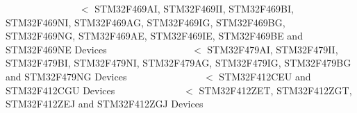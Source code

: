 ~\newline
~\newline
~\newline
~\newline
~\newline
~\newline
~\newline
~\newline
~\newline
 $<$ S\+T\+M32\+F469\+AI, S\+T\+M32\+F469\+II, S\+T\+M32\+F469\+BI, S\+T\+M32\+F469\+NI, S\+T\+M32\+F469\+AG, S\+T\+M32\+F469\+IG, S\+T\+M32\+F469\+BG, S\+T\+M32\+F469\+NG, S\+T\+M32\+F469\+AE, S\+T\+M32\+F469\+IE, S\+T\+M32\+F469\+BE and S\+T\+M32\+F469\+NE Devices ~\newline
~\newline
~\newline
~\newline
~\newline
~\newline
~\newline
~\newline
~\newline
~\newline
 $<$ S\+T\+M32\+F479\+AI, S\+T\+M32\+F479\+II, S\+T\+M32\+F479\+BI, S\+T\+M32\+F479\+NI, S\+T\+M32\+F479\+AG, S\+T\+M32\+F479\+IG, S\+T\+M32\+F479\+BG and S\+T\+M32\+F479\+NG Devices ~\newline
~\newline
~\newline
~\newline
~\newline
~\newline
~\newline
~\newline
~\newline
 $<$ S\+T\+M32\+F412\+C\+EU and S\+T\+M32\+F412\+C\+GU Devices ~\newline
~\newline
~\newline
~\newline
~\newline
~\newline
~\newline
~\newline
 $<$ S\+T\+M32\+F412\+Z\+ET, S\+T\+M32\+F412\+Z\+GT, S\+T\+M32\+F412\+Z\+EJ and S\+T\+M32\+F412\+Z\+GJ Devices ~\newline
~\newline
~\newline
~\newline
